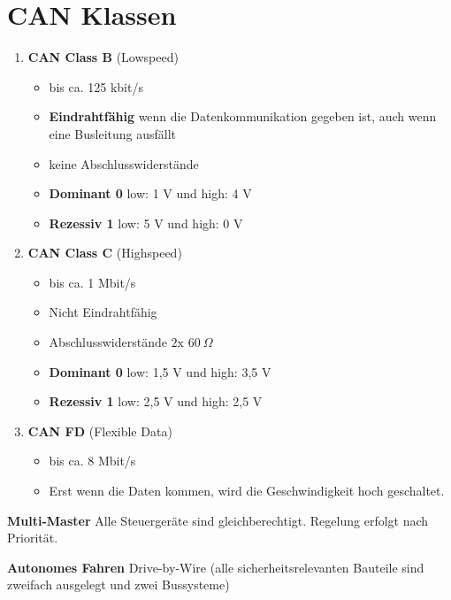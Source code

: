 \newpage

\section{CAN Klassen}\label{can-klassen}

\begin{enumerate}
\item
  \textbf{CAN Class B} (Lowspeed)

  \begin{itemize}
  \item
    bis ca. 125 kbit/s
  \item
    \textbf{Eindrahtfähig} wenn die Datenkommunikation gegeben ist, auch
    wenn eine Busleitung ausfällt
  \item
    keine Abschlusswiderstände
  \item
    \textbf{Dominant 0} low: 1 V und high: 4 V
  \item
    \textbf{Rezessiv 1} low: 5 V und high: 0 V
  \end{itemize}
\item
  \textbf{CAN Class C} (Highspeed)

  \begin{itemize}
  \item
    bis ca. 1 Mbit/s
  \item
    Nicht Eindrahtfähig
  \item
    Abschlusswiderstände $2\text{x } 60~\Omega$
  \item
    \textbf{Dominant 0} low: 1,5 V und high: 3,5 V
  \item
    \textbf{Rezessiv 1} low: 2,5 V und high: 2,5 V
  \end{itemize}
\item
  \textbf{CAN FD} (Flexible Data)

  \begin{itemize}
  \item
    bis ca. 8 Mbit/s
  \item
    Erst wenn die Daten kommen, wird die Geschwindigkeit hoch
    geschaltet.
  \end{itemize}
\end{enumerate}

\textbf{Multi-Master} Alle Steuergeräte sind gleichberechtigt. Regelung
erfolgt nach Priorität.

\textbf{Autonomes Fahren} Drive-by-Wire (alle sicherheitsrelevanten
Bauteile sind zweifach ausgelegt und zwei Bussysteme)

\newpage

